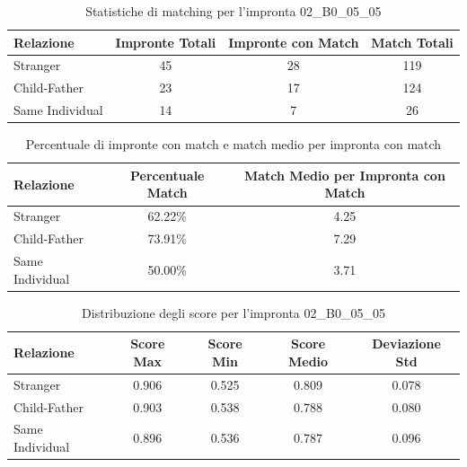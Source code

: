 \begin{table}[htbp]
\centering
\caption{Statistiche di matching per l'impronta 02\_B0\_05\_05}
\label{tab:results_02_B0_05_05}
\begin{tabular}{|l|c|c|c|}
\hline
\textbf{Relazione} & \textbf{Impronte Totali} & \textbf{Impronte con Match} & \textbf{Match Totali} \\
\hline
Stranger & 45 & 28 & 119 \\
\hline
Child-Father & 23 & 17 & 124 \\
\hline
Same Individual & 14 & 7 & 26 \\
\hline
\end{tabular}
\end{table}


\begin{table}[htbp]
\centering
\caption{Percentuale di impronte con match e match medio per impronta con match}
\label{tab:match_percentage_02_B0_05_05}
\begin{tabular}{|l|c|c|}
\hline
\textbf{Relazione} & \textbf{Percentuale Match} & \textbf{Match Medio per Impronta con Match} \\
\hline
Stranger & 62.22\% & 4.25 \\
\hline
Child-Father & 73.91\% & 7.29 \\
\hline
Same Individual & 50.00\% & 3.71 \\
\hline
\end{tabular}
\end{table}


\begin{table}[htbp]
\centering
\caption{Distribuzione degli score per l'impronta 02\_B0\_05\_05}
\label{tab:scores_02_B0_05_05}
\begin{tabular}{|l|c|c|c|c|}
\hline
\textbf{Relazione} & \textbf{Score Max} & \textbf{Score Min} & \textbf{Score Medio} & \textbf{Deviazione Std} \\
\hline
Stranger & 0.906 & 0.525 & 0.809 & 0.078 \\
\hline
Child-Father & 0.903 & 0.538 & 0.788 & 0.080 \\
\hline
Same Individual & 0.896 & 0.536 & 0.787 & 0.096 \\
\hline
\end{tabular}
\end{table}

